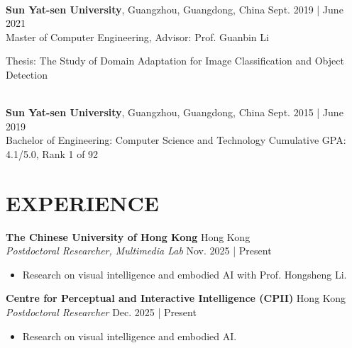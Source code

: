 \documentclass[a4paper,9pt]{extarticle}
\begin{document}
\noindent\\
\textbf{Sun Yat-sen University}, Guangzhou, Guangdong, China \hfill Sept. 2019 | June 2021\\ %
Master of Computer Engineering, Advisor: Prof. Guanbin Li %

\noindent
Thesis: The Study of Domain Adaptation for Image Classification and Object Detection%

\noindent\\
\textbf{Sun Yat-sen University}, Guangzhou, Guangdong, China \hfill Sept. 2015 | June 2019\\ %
Bachelor of Engineering: Computer Science and Technology \hfill Cumulative GPA: 4.1/5.0, Rank 1 of 92 \\ %

\section*{EXPERIENCE}

\noindent
\textbf{The Chinese University of Hong Kong} \hfill Hong Kong\\
\textit{Postdoctoral Researcher, Multimedia Lab} \hfill Nov. 2025 | Present
\begin{itemize}
    \item Research on visual intelligence and embodied AI with Prof. Hongsheng Li.
\end{itemize}

\noindent
\textbf{Centre for Perceptual and Interactive Intelligence (CPII)} \hfill Hong Kong\\
\textit{Postdoctoral Researcher} \hfill Dec. 2025 | Present
\begin{itemize}
    \item Research on visual intelligence and embodied AI.
\end{itemize}

\end{document}
